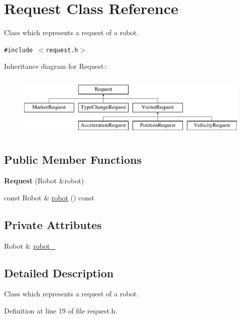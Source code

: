 \hypertarget{class_request}{
\section{Request Class Reference}
\label{class_request}
}
Class which represents a request of a robot.  


{\tt \#include $<$request.h$>$}

Inheritance diagram for Request::\begin{figure}[H]
\begin{center}
\leavevmode
\includegraphics[height=3cm]{class_request}
\end{center}
\end{figure}
\subsection*{Public Member Functions}
\begin{CompactItemize}
\item 
\hypertarget{class_request_e6f2f79d4ba96802e0bc97bfe4d67c83}{
\textbf{Request} (Robot \&robot)}
\label{class_request_e6f2f79d4ba96802e0bc97bfe4d67c83}

\item 
const Robot \& \hyperlink{class_request_4bb10126bc0069cd7aa4dfe2f6d6c3fe}{robot} () const 
\end{CompactItemize}
\subsection*{Private Attributes}
\begin{CompactItemize}
\item 
Robot \& \hyperlink{class_request_2dcc3df8dd7a258caf4c605962581e8d}{robot\_\-}
\end{CompactItemize}


\subsection{Detailed Description}
Class which represents a request of a robot. 

Definition at line 19 of file request.h.

